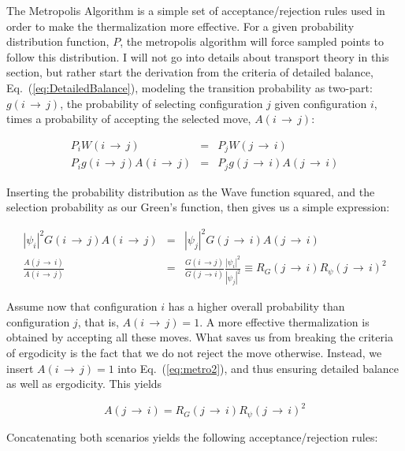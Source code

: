 The Metropolis Algorithm is a simple set of acceptance/rejection rules used in order to make the thermalization more effective. For a given probability distribution function, $P$, the metropolis algorithm will force sampled points to follow this distribution. I will not go into details about transport theory in this section, but rather start the derivation from the criteria of detailed balance, Eq.~(\ref{eq:DetailedBalance}), modeling the transition probability as two-part: $g(i\,\rightarrow\,j)$, the probability of selecting configuration $j$ given configuration $i$, times a probability of accepting the selected move, $A(i\,\rightarrow\,j)$:

\begin{eqnarray}
 \label{eq:metro1}
 P_iW(i\,\rightarrow\,j) &=& P_jW(j\,\rightarrow\,i) \nonumber \\
 P_ig(i\,\rightarrow\,j)A(i\,\rightarrow\,j) &=& P_jg(j\,\rightarrow\,i)A(j\,\rightarrow\,i)
\end{eqnarray}

Inserting the probability distribution as the Wave function squared, and the selection probability as our Green's function, then gives us a simple expression:

\begin{eqnarray}
  \label{eq:metro2}
  |\psi_i|^2G(i\,\rightarrow\,j)A(i\,\rightarrow\,j) &=& |\psi_j|^2G(j\,\rightarrow\,i)A(j\,\rightarrow\,i) \nonumber \\
  \frac{A(j\,\rightarrow\,i)}{A(i\,\rightarrow\,j)} &=& \frac{G(i\,\rightarrow j)}{G(j\,\rightarrow i)}\frac{|\psi_i|^2}{|\psi_j|^2} \equiv R_G(j\,\rightarrow\,i)R_\psi(j\,\rightarrow\,i)^2
\end{eqnarray}

Assume now that configuration $i$ has a higher overall probability than configuration $j$, that is, $A(i\,\rightarrow\,j) = 1$. A more effective thermalization is obtained by accepting all these moves. What saves us from breaking the criteria of ergodicity is the fact that we do not reject the move otherwise. Instead, we insert $A(i\,\rightarrow\,j) = 1$ into Eq.~(\ref{eq:metro2}), and thus ensuring detailed balance as well as ergodicity. This yields

\begin{equation*}
 A(j\,\rightarrow\,i) = R_G(j\,\rightarrow\,i)R_\psi(j\,\rightarrow\,i)^2
\end{equation*}


Concatenating both scenarios yields the following acceptance/rejection rules:


